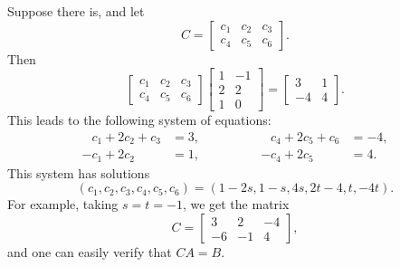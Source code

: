 \begin{solution}
  Suppose there is, and let
  \begin{equation*}
    C =
    \begin{bmatrix}
      c_1 & c_2 & c_3 \\
      c_4 & c_5 & c_6
    \end{bmatrix}.
  \end{equation*}
  Then
  \begin{equation*}
    \begin{bmatrix}
      c_1 & c_2 & c_3 \\
      c_4 & c_5 & c_6
    \end{bmatrix}
    \begin{bmatrix}
      1 & -1 \\
      2 & 2 \\
      1 & 0
    \end{bmatrix}
    =
    \begin{bmatrix}
      3 & 1 \\
      -4 & 4
    \end{bmatrix}.
  \end{equation*}
  This leads to the following system of equations:
  \begin{equation*}
    \begin{split}
      \phantom{-{}}c_1 + 2c_2 + c_3 &= 3, \\
      -c_1 + 2c_2 \phantom{{}+c_3} &= 1,
    \end{split}
    \qquad\qquad
    \begin{split}
      \phantom{-{}}c_4 + 2c_5 + c_6 &= -4, \\
      -c_4 + 2c_5 \phantom{{}+c_6} &= 4.
    \end{split}
  \end{equation*}
  This system has solutions
  \begin{equation*}
    (c_1,c_2,c_3,c_4,c_5,c_6) =
    (1 - 2s, 1 - s, 4s, 2t - 4, t, -4t).
  \end{equation*}
  For example, taking $s = t = -1$, we get the matrix
  \begin{equation*}
    C =
    \begin{bmatrix}
      3 & 2 & -4 \\
      -6 & -1 & 4
    \end{bmatrix},
  \end{equation*}
  and one can easily verify that $CA = B$.
\end{solution}

